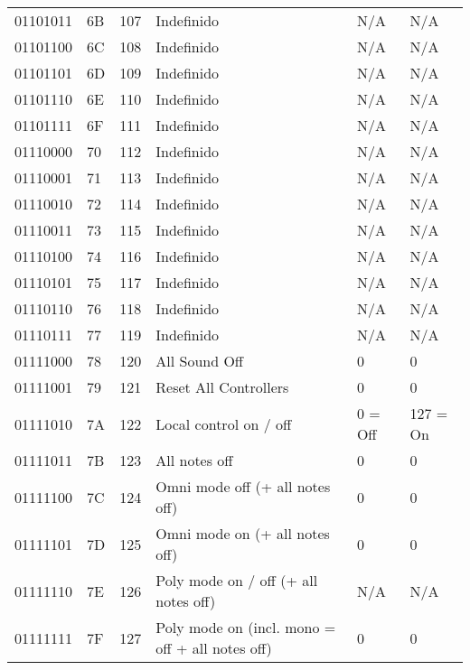 \begin{center}
\begin{supertabular}{| C{2cm} | C{1.5cm} | C{1.5cm} | C{5.3cm} | C{1.5cm} | C{1.5cm} |}
                01101011 & 6B & 107 & Indefinido & N/A & N/A \\
             01101100 & 6C & 108 & Indefinido & N/A & N/A \\
                01101101 & 6D & 109 & Indefinido & N/A & N/A \\
             01101110 & 6E & 110 & Indefinido & N/A & N/A \\
                01101111 & 6F & 111 & Indefinido & N/A & N/A \\
             01110000 & 70 & 112 & Indefinido & N/A & N/A \\
                01110001 & 71 & 113 & Indefinido & N/A & N/A \\
             01110010 & 72 & 114 & Indefinido & N/A & N/A \\
                01110011 & 73 & 115 & Indefinido & N/A & N/A \\
             01110100 & 74 & 116 & Indefinido & N/A & N/A \\
                01110101 & 75 & 117 & Indefinido & N/A & N/A \\
             01110110 & 76 & 118 & Indefinido & N/A & N/A \\
                01110111 & 77 & 119 & Indefinido & N/A & N/A \\
             01111000 & 78 & 120 & All Sound Off & 0 & 0 \\
                01111001 & 79 & 121 & Reset All Controllers & 0 & 0 \\
             01111010 & 7A & 122 & Local control on / off & 0 = Off & 127 = On \\
                01111011 & 7B & 123 & All notes off & 0 & 0 \\
             01111100 & 7C & 124 & Omni mode off (+ all notes off) & 0 & 0 \\
                01111101 & 7D & 125 & Omni mode on (+ all notes off) & 0 & 0 \\
             01111110 & 7E & 126 & Poly mode on / off (+ all notes off) & N/A & N/A \\
                01111111 & 7F & 127 & Poly mode on (incl. mono = off + all notes off) & 0 & 0 \\
        \end{supertabular}
        \end{center}

